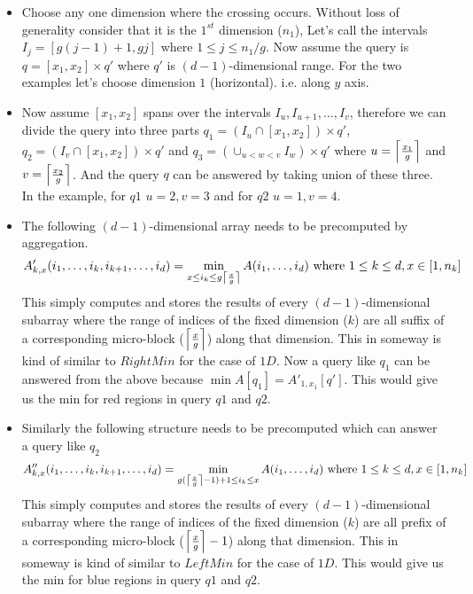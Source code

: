 \begin{itemize} \itemsep1pt \parskip0pt 
\item Choose any one dimension where the crossing occurs. Without loss of generality consider that it is the $1^{st}$ dimension ($n_1$), Let's call the intervals $I_j=[g(j-1)+1,gj]$ where $1\leq j\leq n_1/g$. Now assume the query is $q=[x_1,x_2]\times q'$ where $q'$ is $(d-1)$-dimensional range. For the two examples let's choose dimension $1$ (horizontal). i.e. along $y$ axis.
\item Now assume $[x_1,x_2]$ spans over the intervals $I_u,I_{u+1},\ldots,I_v$, therefore we can divide the query into three parts $q_1=(I_u\cap[x_1,x_2])\times q'$, $q_2=(I_v\cap[x_1,x_2])\times q'$ and $q_3=(\cup_{u<w<v}I_w)\times q'$ where $u=\ceil*{\frac{x_1}{g}}$ and $v=\ceil*{\frac{x_2}{g}}$. And the query $q$ can be answered by taking union of these three. In the example, for $q1$ $u=2,v=3$ and for $q2$ $u=1,v=4$.
\item The following $(d-1)$-dimensional array needs to be precomputed by aggregation.
\begin{align}
\label{a'}
A'_{k,x}(i_1,\ldots ,i_k,i_{k+1},\ldots, i_d)=\min_{x\leq i_k	\leq g\ceil*{\frac{x}{g}}} A(i_1,\ldots,i_d) \text{ where } 1\leq k\leq d, x\in [1,n_k]
\end{align}
This simply computes and stores the results of every $(d-1)$-dimensional subarray where the range of indices of the fixed dimension ($k$) are all suffix of a corresponding micro-block ($\ceil*{\frac{x}{g}}$) along that dimension. This in someway is kind of similar to $RightMin$ for the case of $1D$. Now a query like $q_1$ can be answered from the above because $\min A[q_1]=A'_{1,x_1}[q']$. This would give us the min for red regions in query $q1$ and $q2$.
\item Similarly the following structure needs to be precomputed which can answer a query like $q_2$
\begin{align}
\label{a''}
A''_{k,x}(i_1,\ldots ,i_k,i_{k+1},\ldots, i_d)=\min_{g(\ceil*{\frac{x}{g}}-1)+1\leq i_k	\leq x} A(i_1,\ldots,i_d) \text{ where } 1\leq k\leq d, x\in [1,n_k]
\end{align}
This simply computes and stores the results of every $(d-1)$-dimensional subarray where the range of indices of the fixed dimension ($k$) are all prefix of a corresponding micro-block ($\ceil*{\frac{x}{g}}-1$) along that dimension. This in someway is kind of similar to $LeftMin$ for the case of $1D$. This would give us the min for blue regions in query $q1$ and $q2$.

\end{itemize}

